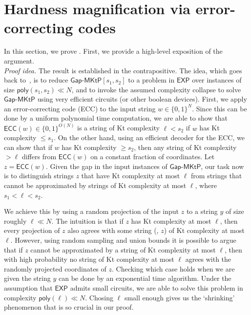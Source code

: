 \documentclass{toc}
\newcommand{\gapmktp}{\mathsf{Gap}$-$\mathsf{MKtP}}
\begin{document}
\section{Hardness magnification via error-correcting codes}\label{s:magnification}

In this section, we prove . First, we provide a high-level exposition of the argument.\\

\noindent \emph{Proof idea.} The result is established in the contrapositive. The idea, which goes back to~\cite[Theorem 3]{OS18}, is to reduce $\gapmktp[s_1,s_2]$ to a problem in $\mathsf{EXP}$ over instances of size $\mathsf{poly}(s_1,s_2) \ll N$, and to invoke the assumed complexity collapse to solve $\gapmktp$ using very efficient circuits (or other boolean devices). First, we apply an error-correcting code (ECC) to the input string $w \in \{0,1\}^N$. Since this can be done by a uniform polynomial time computation, we are able to show that $\mathsf{ECC}(w) \in \{0,1\}^{O(N)}$ is a string of Kt complexity $\ell < s_2$ if $w$ has Kt complexity $\leq s_1$. On the other hand, using an efficient decoder for the ECC, we can show that if $w$ has Kt complexity $\geq s_2$, then any string of Kt complexity $> \ell$ differs from $\mathsf{ECC}(w)$ on a constant fraction of coordinates. Let $z = \mathsf{ECC}(w)$. Given the gap in the input instances of $\gapmktp$, our task now is to distinguish strings $z$ that have Kt complexity at most $\ell$ from strings that cannot be approximated by strings of Kt complexity at most $\ell$, where $s_1 < \ell < s_2$.

We achieve this by using a random projection of the input $z$ to a string $y$ of size roughly $\ell \ll N$. The intuition is that if $z$ has Kt complexity at most $\ell$, then every projection of $z$ also agrees with some string (\ie, $z$) of Kt complexity at most $\ell$. However, using random sampling and union bounds it is possible to argue that if $z$ cannot be approximated by a string of Kt complexity at most $\ell$, then with high probability no string of Kt complexity at most $\ell$ agrees with the randomly projected coordinates of $z$. Checking which case holds when we are given the string $y$ can be done by an exponential time algorithm. Under the assumption that $\mathsf{EXP}$ admits small circuits, we are able to solve this problem in complexity $\mathsf{poly}(\ell) \ll N$. Chosing $\ell$ small enough gives us the `shrinking' phenomenon that is so crucial in our proof.
\end{document}
